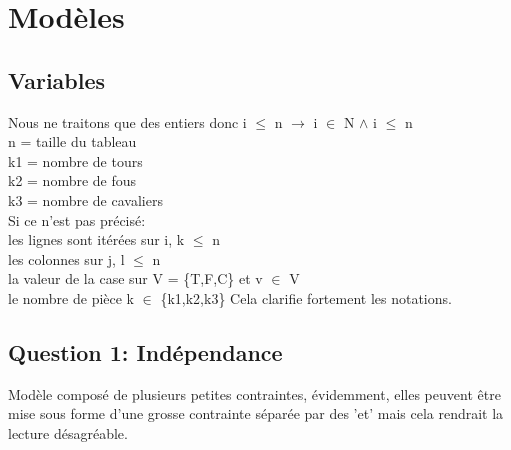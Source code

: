 \section{Modèles}


\subsection{Variables}
Nous ne traitons que des entiers donc i $\leq$ n $\longrightarrow$ i $\in$ N $\land$ i $\leq$ n \\
n = taille du tableau\\
k1 = nombre de tours\\
k2 = nombre de fous\\
k3 = nombre de cavaliers\\

Si ce n'est pas précisé: \\
les lignes sont itérées sur i, k $\leq$ n \\
les colonnes sur j, l $\leq$ n \\
la valeur de la case sur  V = \{T,F,C\} et v $\in$ V \\
le nombre de pièce k $\in$ \{k1,k2,k3\}
Cela clarifie fortement les notations. \\



\subsection{Question 1: Indépendance}
Modèle composé de plusieurs petites contraintes, évidemment, elles peuvent être mise sous forme d'une grosse contrainte séparée par des 'et' mais cela rendrait la lecture désagréable.\\

